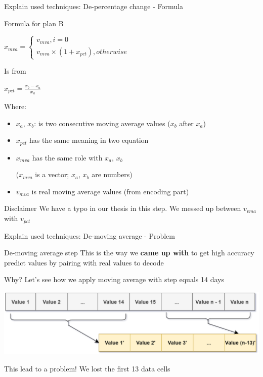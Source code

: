 \documentclass[compress, mathserif, fleqn, 10pt]{beamer}
\begin{document}
	\begin{frame}{Explain used techniques: De-percentage change - Formula}
		\begin{block}{Formula for plan B}
			\centerline{$
				x_{mva}=\left\{
				\begin{array}{l}
					v_{mva}, i=0                                    \\
					v_{mva} \times\left(1+x_{pct}\right), otherwise
				\end{array}\right.
			$}
			
			\smallskip
			
			\centerline{Is from}
			
			\smallskip
			
			\centerline{$x_{pct}=\frac{x_b - x_a}{x_a}$}
			
			\smallskip
			Where:
			
			\begin{itemize}
				\item $x_a$, $x_b$: is two consecutive moving average values ($x_b$ after $x_a$)
				\item $x_{pct}$ has the same meaning in two equation
				\item $x_{mva}$ has the same role with $x_a$, $x_b$ 
				
					($x_{mva}$ is a vector; $x_a$, $x_b$ are numbers)
				\item $v_{mva}$ is real moving average values (from encoding part)
			\end{itemize}
		\end{block}
		
		\begin{exampleblock}{Disclaimer}
			We have a typo in our thesis in this step. We messed up between $v_{vma}$ with $v_{pct}$
		\end{exampleblock}
	\end{frame}
	
	\begin{frame}{Explain used techniques: De-moving average - Problem}
		\begin{block}{De-moving average step}
			This is the way we \textbf{came up with} to get high accuracy predict values by pairing with real values to decode
			
			Why? Let's see how we apply moving average with step equals 14 days
		\end{block}
		\smallskip
		\centerline{\includegraphics[width=\textwidth]{images/enc_moving.eps}}
		\bigskip
		\begin{exampleblock}{This lead to a problem!}
			We lost the first 13 data cells
		\end{exampleblock}
	\end{frame}
	
\end{document}
